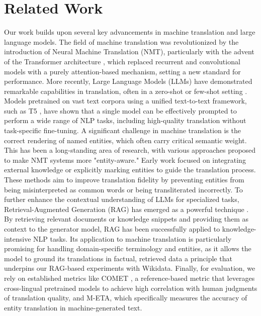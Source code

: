 \documentclass{ecai}
\begin{document}
\section{Related Work}
\label{sec:related}
Our work builds upon several key advancements in machine translation and large language models. 
The field of machine translation was revolutionized by the introduction of Neural Machine Translation (NMT), 
particularly with the advent of the Transformer architecture \cite{vaswani2017attention}, 
which replaced recurrent and convolutional models with a purely attention-based mechanism, 
setting a new standard for performance.
More recently, Large Language Models (LLMs) have demonstrated remarkable capabilities in translation, 
often in a zero-shot or few-shot setting \cite{brown2020language}. 
Models pretrained on vast text corpora using a unified text-to-text framework, 
such as T5 \cite{raffel2020exploring}, have shown that a single model can be effectively prompted 
to perform a wide range of NLP tasks, including high-quality translation without task-specific fine-tuning.
A significant challenge in machine translation is the correct rendering of named entities,
which often carry critical semantic weight. This has been a long-standing area of research, 
with various approaches proposed to make NMT systems more "entity-aware." 
Early work focused on integrating external knowledge or explicitly marking entities to guide the translation process. 
These methods aim to improve translation fidelity by preventing entities from being misinterpreted 
as common words or being transliterated incorrectly.
To further enhance the contextual understanding of LLMs for specialized tasks, 
Retrieval-Augmented Generation (RAG) has emerged as a powerful technique \cite{lewis2020retrieval}. 
By retrieving relevant documents or knowledge snippets and providing them as context to the generator model, 
RAG has been successfully applied to knowledge-intensive NLP tasks. Its application to machine translation is 
particularly promising for handling domain-specific terminology and entities, 
as it allows the model to ground its translations in factual, retrieved data
a principle that underpins our RAG-based experiments with Wikidata. 
Finally, for evaluation, we rely on established metrics like COMET \cite{rei-etal-2020-comet}, 
a reference-based metric that leverages cross-lingual pretrained models to achieve high correlation
with human judgments of translation quality, and M-ETA,
which specifically measures the accuracy of entity translation in machine-generated text.
\end{document}
